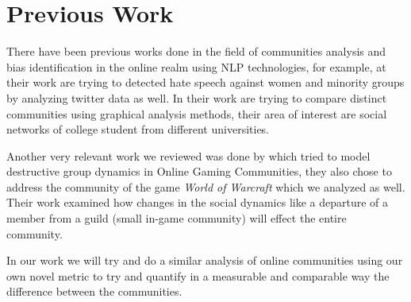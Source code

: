 \section{Previous Work}
There have been previous works done in the field of communities analysis and bias identification in the online realm using NLP technologies, for example, at their work \cite{wang2019ynu} are trying to detected hate speech against women and minority groups by analyzing twitter data as well. In their work \cite{traud2011comparing} are trying to compare distinct communities using graphical analysis methods, their area of interest are social networks of college student from different universities.

Another very relevant work we reviewed was done by \cite{patil2012modeling} which tried to model destructive group dynamics in Online Gaming Communities, they also chose to address the community of the game \emph{World of Warcraft} which we analyzed as well. Their work examined how changes in the social dynamics like a departure of a member from a guild (small in-game community) will effect the entire community.

In our work we will try and do a similar analysis of online communities using our own novel metric to try and quantify in a measurable and comparable way the difference between the communities.
